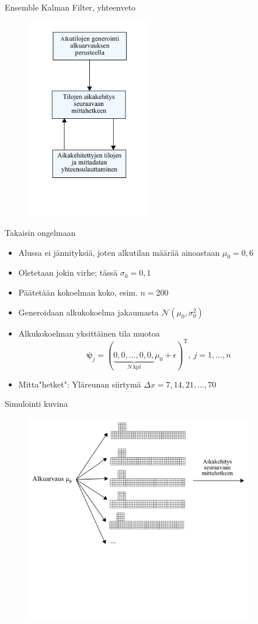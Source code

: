 \documentclass{beamer}
\begin{document}
\begin{frame}{Ensemble Kalman Filter, yhteenveto}

\begin{figure}
\includegraphics[width=5.5cm]{enkf_luuppi.pdf}
\end{figure}

\end{frame}

\begin{frame}{Takaisin ongelmaan}

\begin{itemize}
\item Alussa ei jännityksiä, joten alkutilan määrää ainoastaan $\mu_0 = 0{,}6$
\item Oletetaan jokin virhe; tässä $\sigma_0 = 0{,}1$
\item Päätetään kokoelman koko, esim. $n=200$
\item Generoidaan alkukokoelma jakaumasta $\mathcal{N}(\mu_0,\sigma_0^2)$
\item Alkukokoelman yksittäinen tila muotoa
\[
\boldsymbol{\psi}_j = (\underbrace{0, 0, \dots, 0, 0,}_{N~\text{kpl}} \mu_0 + \epsilon )^\mathrm{T},~j=1,\dots,n
\]
\item Mitta"hetket": Yläreunan siirtymä $\Delta x = 7,14,21,\dots,70$
\end{itemize}

\end{frame}

\begin{frame}{Simulointi kuvina}

\begin{figure}
\includegraphics[width=10cm]{alkukokoelma.pdf}
\end{figure}

\end{frame}
\end{document}
